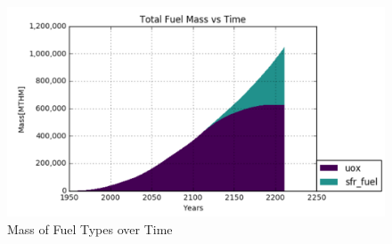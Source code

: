 \begin{figure}[h]
	\centering
	\includegraphics[width=\linewidth]{images/transition-fuelmass}
	\caption{Mass of Fuel Types over Time}
	\label{fig:fuel-mass}
\end{figure}